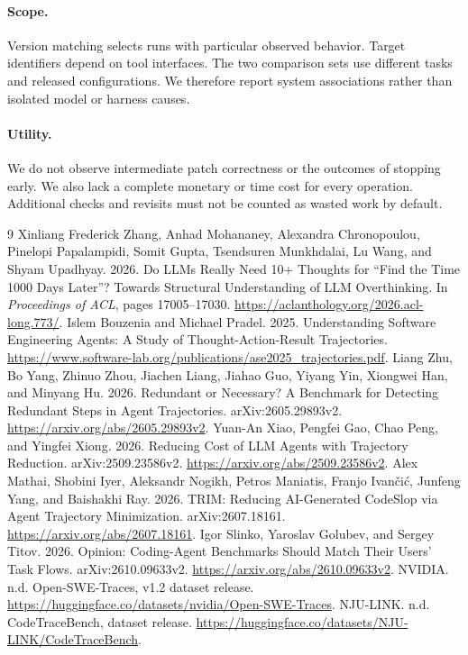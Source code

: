 \documentclass[10pt,a4paper,twocolumn]{article}
\begin{document}
\paragraph{Scope.}
Version matching selects runs with particular observed behavior. Target identifiers depend on tool interfaces. The two comparison sets use different tasks and released configurations. We therefore report system associations rather than isolated model or harness causes.
\paragraph{Utility.}
We do not observe intermediate patch correctness or the outcomes of stopping early. We also lack a complete monetary or time cost for every operation. Additional checks and revisits must not be counted as wasted work by default.

\begin{thebibliography}{9}
\small
{}
Xinliang Frederick Zhang, Anhad Mohananey, Alexandra Chronopoulou, Pinelopi Papalampidi, Somit Gupta, Tsendsuren Munkhdalai, Lu Wang, and Shyam Upadhyay. 2026.
\newblock Do LLMs Really Need 10+ Thoughts for ``Find the Time 1000 Days Later''? Towards Structural Understanding of LLM Overthinking.
\newblock In \emph{Proceedings of ACL}, pages 17005--17030. \url{https://aclanthology.org/2026.acl-long.773/}.
Islem Bouzenia and Michael Pradel. 2025.
\newblock Understanding Software Engineering Agents: A Study of Thought-Action-Result Trajectories.
\newblock \url{https://www.software-lab.org/publications/ase2025_trajectories.pdf}.
Liang Zhu, Bo Yang, Zhinuo Zhou, Jiachen Liang, Jiahao Guo, Yiyang Yin, Xiongwei Han, and Minyang Hu. 2026.
\newblock Redundant or Necessary? A Benchmark for Detecting Redundant Steps in Agent Trajectories.
\newblock arXiv:2605.29893v2. \url{https://arxiv.org/abs/2605.29893v2}.
Yuan-An Xiao, Pengfei Gao, Chao Peng, and Yingfei Xiong. 2026.
\newblock Reducing Cost of LLM Agents with Trajectory Reduction.
\newblock arXiv:2509.23586v2. \url{https://arxiv.org/abs/2509.23586v2}.
Alex Mathai, Shobini Iyer, Aleksandr Nogikh, Petros Maniatis, Franjo Ivan\v{c}i\'{c}, Junfeng Yang, and Baishakhi Ray. 2026.
\newblock TRIM: Reducing AI-Generated CodeSlop via Agent Trajectory Minimization.
\newblock arXiv:2607.18161. \url{https://arxiv.org/abs/2607.18161}.
Igor Slinko, Yaroslav Golubev, and Sergey Titov. 2026.
\newblock Opinion: Coding-Agent Benchmarks Should Match Their Users' Task Flows.
\newblock arXiv:2610.09633v2. \url{https://arxiv.org/abs/2610.09633v2}.
NVIDIA. n.d. Open-SWE-Traces, v1.2 dataset release.
\newblock \url{https://huggingface.co/datasets/nvidia/Open-SWE-Traces}.
NJU-LINK. n.d. CodeTraceBench, dataset release.
\newblock \url{https://huggingface.co/datasets/NJU-LINK/CodeTraceBench}.
\end{thebibliography}
\end{document}
